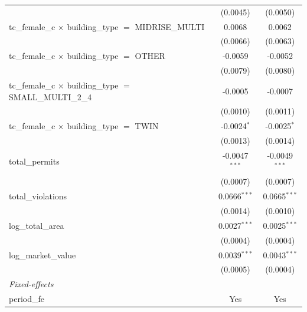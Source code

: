 \begin{tabular}{lcc}
                                                                       & (0.0045)        & (0.0050)\\   
   tc\_female\_c $\times$ building\_type $=$ MIDRISE\_MULTI            & 0.0068          & 0.0062\\   
                                                                       & (0.0066)        & (0.0063)\\   
   tc\_female\_c $\times$ building\_type $=$ OTHER                     & -0.0059         & -0.0052\\   
                                                                       & (0.0079)        & (0.0080)\\   
   tc\_female\_c $\times$ building\_type $=$ SMALL\_MULTI\_2\_4        & -0.0005         & -0.0007\\   
                                                                       & (0.0010)        & (0.0011)\\   
   tc\_female\_c $\times$ building\_type $=$ TWIN                      & -0.0024$^{*}$   & -0.0025$^{*}$\\   
                                                                       & (0.0013)        & (0.0014)\\   
   total\_permits                                                      & -0.0047$^{***}$ & -0.0049$^{***}$\\   
                                                                       & (0.0007)        & (0.0007)\\   
   total\_violations                                                   & 0.0666$^{***}$  & 0.0665$^{***}$\\   
                                                                       & (0.0014)        & (0.0010)\\   
   log\_total\_area                                                    & 0.0027$^{***}$  & 0.0025$^{***}$\\   
                                                                       & (0.0004)        & (0.0004)\\   
   log\_market\_value                                                  & 0.0039$^{***}$  & 0.0043$^{***}$\\   
                                                                       & (0.0005)        & (0.0004)\\   
   \midrule
   \emph{Fixed-effects}\\
   period\_fe                                                          & Yes             & Yes\\  

\end{tabular}
